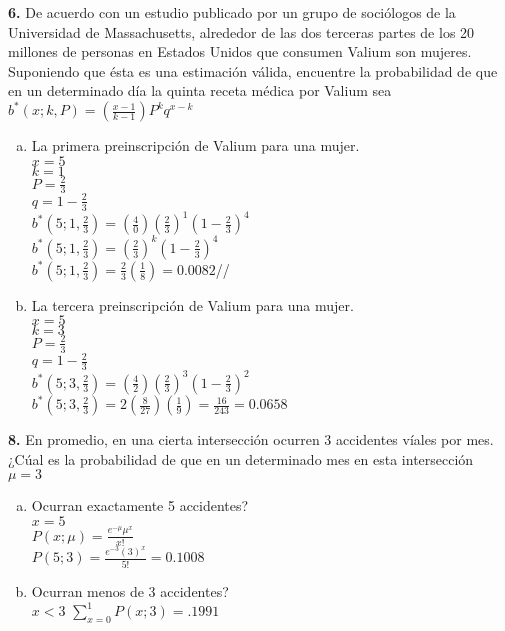 \documentclass[12pt, letterpaper]{article}
\begin{document}
    \textbf{6. } De acuerdo con un estudio publicado por un grupo de sociólogos de la Universidad de Massachusetts, alrededor de las dos terceras partes de los 20 millones de personas en Estados Unidos que consumen Valium son mujeres. Suponiendo que ésta es una estimación válida, encuentre la probabilidad de que en un determinado día la quinta receta médica por Valium sea\\
$b^*(x;k,P)=\left( \frac{x-1}{k-1}\right) P^k q^{x-k}$\\    
    \begin{enumerate}[a)]
    	\item La primera preinscripción de Valium para una mujer.\\
    	$x=5$\\
    	$k=1$\\
    	$P=\frac{2}{3}$\\
    	$q=1-\frac{2}{3}$\\
    	$b^*(5;1,\frac{2}{3})=\left( \frac{4}{0}\right) \left( \frac{2}{3}\right)^1 \left( 1-\frac{2}{3}\right)^{4}$\\
    	$b^*(5;1,\frac{2}{3})=\left( \frac{2}{3}\right)^k \left( 1-\frac{2}{3}\right)^{4}$\\
    	$b^*(5;1,\frac{2}{3})=\frac{2}{3}\left(\frac{1}{8}\right)=0.0082$//
    	\item La tercera preinscripción de Valium para una mujer.\\
    	$x=5$\\
    	$k=3$\\
    	$P=\frac{2}{3}$\\
    	$q=1-\frac{2}{3}$\\
    	$b^*(5;3,\frac{2}{3})=\left( \frac{4}{2}\right) \left( \frac{2}{3}\right)^3 \left( 1-\frac{2}{3}\right)^{2}$\\
    	$b^*(5;3,\frac{2}{3})=2\left( \frac{8}{27}\right) \left( \frac{1}{9}\right)= \frac{16}{243}=0.0658$\\
    	
    	
    \end{enumerate}
    
    \vskip1cm

    \textbf{8. }En promedio, en una cierta intersección ocurren 3 accidentes víales por mes. ¿Cúal es la probabilidad de que en un determinado mes en esta intersección\\
	$\mu =3$\\    
    \begin{enumerate}[a)]
    \item Ocurran exactamente 5 accidentes?\\
	$x=5$\\    
    $P(x;\mu)= \frac{e^{-\mu}\mu ^x}{x!}$\\
    $P(5;3)= \frac{e^{-3}(3)^x}{5!}=0.1008$\\
    \item Ocurran menos de 3 accidentes?\\
    $x<3$
    $\sum^1_{x=0} P(x;3)=.1991$
    
    \end{enumerate}
    
\end{document}
